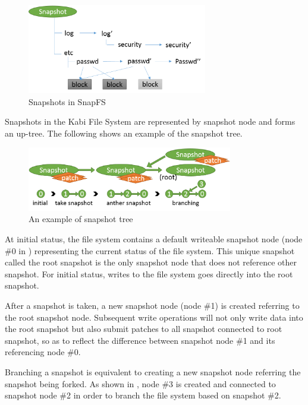 \begin{figure}[hbtp]
\centering
\includegraphics[width=0.7\textwidth]{Chapter-4/figs/fig24.png}
\caption{Snapshots in SnapFS}
\label{fig:snapfs_approach}
\end{figure}

    Snapshots in the Kabi File System are represented by snapshot node and forms an up-tree. The following  shows an example of the snapshot tree.

\begin{figure}[hbtp]
\centering
\includegraphics[width=0.8\textwidth]{Chapter-4/figs/fig13.png}
\caption{An example of snapshot tree}
\label{fig:snap_tree_example}
\end{figure}

    At initial status, the file system contains a default writeable snapshot node (node \#0 in ) representing the current status of the file system. This unique snapshot called the root snapshot is the only snapshot node that does not reference other snapshot. For initial status, writes to the file system goes directly into the root snapshot.
    
    After a snapshot is taken, a new snapshot node (node \#1) is created referring to the root snapshot node. Subsequent write operations will not only write data into the root snapshot but also submit patches to all snapshot connected to root snapshot, so as to reflect the difference between snapshot node \#1 and its referencing node \#0.

    Branching a snapshot is equivalent to creating a new snapshot node referring the snapshot being forked. As shown in , node \#3 is created and connected to snapshot node \#2 in order to branch the file system based on snapshot \#2.

